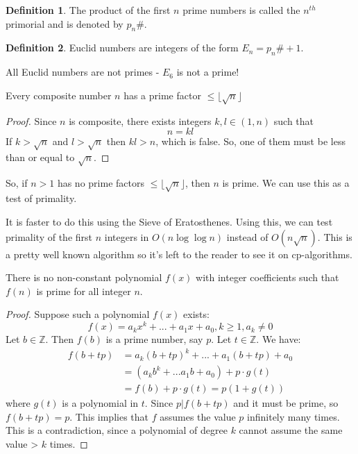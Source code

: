 \documentclass[12pt,letterpaper]{amsbook}
\theoremstyle{definition}
\newtheorem{definition}{Definition} %
\newcommand{\Z}{\mathbb{Z}}
\begin{document}
\begin{definition}
  The product of the first $n$ prime numbers is called the $n^{th}$ primorial and is denoted by $p_n\#$.
\end{definition}

\begin{definition}
  Euclid numbers are integers of the form $E_n = p_n\# +1$.
\end{definition}

All Euclid numbers are not primes - $E_6$ is not a prime!

\begin{theorem}
  Every composite number $n$ has a prime factor $\leq \lfloor \sqrt{n} \rfloor$
\end{theorem}

\begin{proof}
  Since $n$ is composite, there exists integers $k,l \in (1,n)$   such that
  \[n = kl\]
  If $k > \sqrt{n}$ and $l > \sqrt{n}$ then $kl > n$, which is false. So, one of them must be less than or equal to $\sqrt{n}$.
\end{proof}

So, if $n > 1$ has no prime factors $\leq \lfloor \sqrt{n} \rfloor$, then $n$ is prime. We can use this as a test of primality.

It is faster to do this using the Sieve of Eratosthenes. Using this, we can test primality of the first $n$ integers in $O(n \log{\log{n}})$ instead of $O(n\sqrt{n})$. This is a pretty well known algorithm so it's left to the reader to see it on cp-algorithms.

\begin{theorem}
  There is no non-constant polynomial $f(x)$ with integer coefficients such that $f(n)$ is prime for all integer $n$.
\end{theorem}

\begin{proof}
  Suppose such a polynomial $f(x)$ exists:
  \[f(x) = a_kx^k + ... + a_1x + a_0, k \geq 1, a_k \neq 0\]
  Let $b \in \Z$. Then $f(b)$ is a prime number, say $p$. Let $t \in \Z$. We have:
  \begin{align*}
    f(b+tp) &= a_k(b+tp)^k + ... + a_1(b+tp) + a_0 \\
            &= (a_kb^k + ... a_1b + a_0) + p \cdot g(t) \\
            &= f(b) + p \cdot g(t) = p(1+g(t))
  \end{align*}
  where $g(t)$ is a polynomial in $t$. Since $p | f(b+tp)$ and it must be prime, so $f(b+tp) = p$. This implies that $f$ assumes the value $p$ infinitely many times. This is a contradiction, since a polynomial of degree $k$ cannot assume the same value > $k$ times.
\end{proof}
\end{document}
